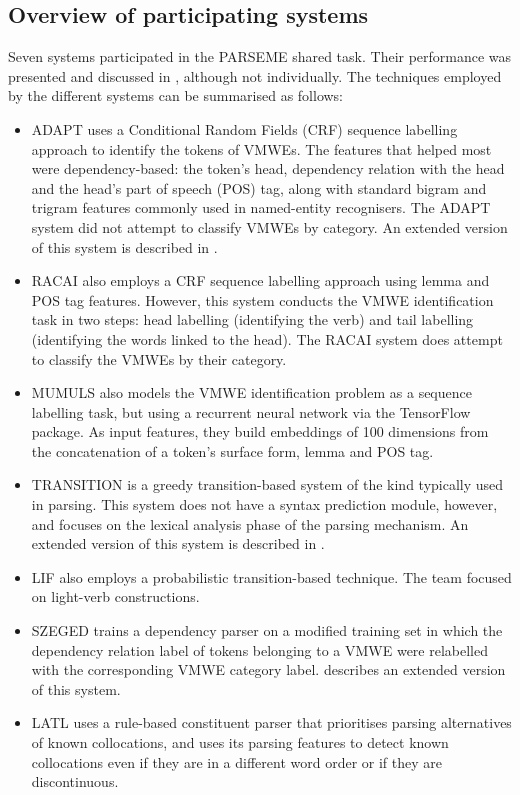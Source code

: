 \documentclass[output=paper,modfonts,nonflat,draftmode]{langsci/langscibook}
\begin{document}
\subsection{Overview of participating systems}

Seven systems participated in the PARSEME shared task. Their performance was presented and discussed in , although not individually. The techniques employed by the different systems can be summarised as follows:

\begin{itemize}
    \item ADAPT \citep{maldonado2017} uses a Conditional Random Fields (CRF) sequence labelling approach to identify the tokens of VMWEs. The features that helped most were dependency-based: the token's head, dependency relation with the head and the head's part of speech (POS) tag, along with standard bigram and trigram features commonly used in named-entity recognisers. The ADAPT system did not attempt to classify VMWEs by category. An extended version of this system is described in .
    \item RACAI \citep{borocs2017} also employs a CRF sequence labelling approach using lemma and POS tag features. However, this system conducts the VMWE identification task in two steps: head labelling (identifying the verb) and tail labelling (identifying the words linked to the head). The RACAI system does attempt to classify the VMWEs by their category. 
    \item MUMULS \citep{W17-1707} also models the VMWE identification problem as a sequence labelling task, but using a recurrent neural network via the TensorFlow package. As input features, they build embeddings of 100 dimensions from the concatenation of a token's surface form, lemma and POS tag. 
    \item TRANSITION \citep{W17-1717} is a greedy transition-based system of the kind typically used in parsing. This system does not have a syntax prediction module, however, and focuses on the lexical analysis phase of the parsing mechanism. An extended version of this system is described in .
    \item LIF \citep{MWEWorkshop} also employs a probabilistic transition-based technique. The team focused on  light-verb constructions. 
    \item SZEGED \citep{Simko2017} trains a dependency parser on a modified training set in which the dependency relation label of tokens belonging to a VMWE were relabelled with the corresponding VMWE category label.  describes an extended version of this system.
    \item LATL \citep{W17-1706} uses a rule-based constituent parser that prioritises parsing alternatives of known collocations, and uses its parsing features to detect known collocations even if they are in a different word order or if they are discontinuous.
\end{itemize}
\end{document}
